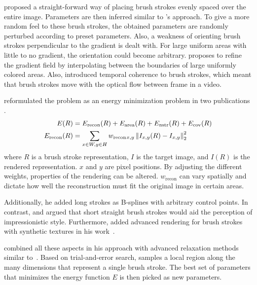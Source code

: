 \citeauthor*{apple} proposed a straight-forward way of placing brush strokes evenly spaced over the entire image.
Parameters are then inferred similar to \citeauthor*{paintbynumbers}'s approach.
To give a more random feel to these brush strokes, the obtained parameters are randomly perturbed according to preset parameters.
Also, a weakness of orienting brush strokes perpendicular to the gradient is dealt with.
For large uniform areas with little to no gradient, the orientation could become arbitrary.
\citeauthor*{apple} proposes to refine the gradient field by interpolating between the boundaries of large uniformly colored areas.
Also, \citeauthor*{apple} introduced temporal coherence to brush strokes, which meant that brush strokes move with the optical flow between frame in a video.

\citeauthor*{hertzmann} reformulated the problem as an energy minimization problem in two publications \cite{hertzmanreview, Hertzmann}.
\begin{align}
    E(R) & = E_{\text{recon}}(R) + E_{\text{area}}(R) + E_{\text{nstr}}(R) + E_{\text{cov}}(R) \\
    E_{\text{recon}}(R) & = \sum_{x \in W, y \in H} w_{\text{recon}}{}_{x, y} \left\lVert I_{x, y}(R) - I_{x, y}\right\rVert^2_2 \\
\end{align}
where $R$ is a brush stroke representation, $I$ is the target image, and $I(R)$ is the rendered representation.
$x$ and $y$ are pixel positions.
By adjusting the different weights, properties of the rendering can be altered.
$w_{\text{recon}}$ can vary spatially and dictate how well the reconstruction must fit the original image in certain areas.

Additionally, he added long strokes as B-splines with arbitrary control points.
In contrast, \citeauthor*{paintbynumbers} and \citeauthor*{apple} argued that short straight brush strokes would aid the perception of impressionistic style.
Furthermore, \citeauthor*{Hertzmann} added advanced rendering for brush strokes with synthetic textures in his work~\cite{Hertzmann}.

\citeauthor*{Hertzmann} combined all these aspects in his approach with advanced relaxation methods similar to~\citeauthor*{paintbynumbers}.
Based on trial-and-error search, \citeauthor*{Hertzmann} samples a local region along the many dimensions that represent a single brush stroke.
The best set of parameters that minimizes the energy function $E$ is then picked as new parameters.

